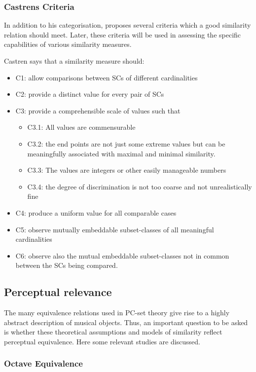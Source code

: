 \documentclass{article}
\begin{document}
\subsubsection{Castrens Criteria}
\label{sec-3-4-3}

In addition to his categorisation, \citet{Castren1994} proposes several
criteria which a good similarity relation should meet. Later, these
criteria will be used in assessing the specific capabilities of
various similarity measures. 

Castren says that a similarity measure should:

\begin{itemize}
\item C1: allow comparisons between SCs of different cardinalities
\item C2: provide a distinct value for every pair of SCs
\item C3: provide a comprehensible scale of values such that
\begin{itemize}
\item C3.1: All values are commensurable
\item C3.2: the end points are not just some extreme values but can be
    meaningfully associated with maximal and minimal similarity.
\item C3.3: The values are integers or other easily manageable numbers
\item C3.4: the degree of discrimination is not too coarse and not
    unrealistically fine
\end{itemize}
\item C4: produce a uniform value for all comparable cases
\item C5: observe mutually embeddable subset-classes of all meaningful
  cardinalities
\item C6: observe also the mutual embeddable subset-classes not in common
  between the SCs being compared.
\end{itemize}
\subsection{Perceptual relevance}
\label{sec-3-5}

The many equivalence relations used in PC-set theory give rise to a
highly abstract description of musical objects. Thus, an important
question to be asked is whether these theoretical assumptions and
models of similarity reflect perceptual equivalence. Here some
relevant studies are discussed.
\subsubsection{Octave Equivalence}
\label{sec-3-5-1}
\end{document}
